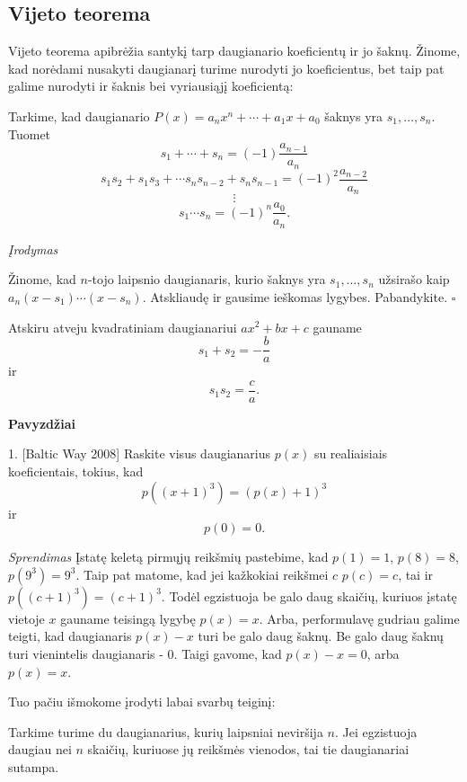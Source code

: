 \subsection{Vijeto teorema}

Vijeto teorema apibrėžia santykį tarp daugianario koeficientų ir jo šaknų.
Žinome, kad norėdami nusakyti daugianarį turime nurodyti jo koeficientus,
bet taip pat galime nurodyti ir šaknis bei vyriausiąjį koeficientą:

\begin{thm}

Tarkime, kad daugianario $P(x)=a_nx^n + \cdots + a_1x + a_0$ šaknys yra
$s_1, \dots, s_n$. Tuomet
$$s_1 + \cdots + s_n = (-1)\frac{a_{n-1}}{a_n}$$
$$s_1s_2 + s_1s_3 + \cdots s_{n}s_{n-2} + s_{n}s_{n-1} =
(-1)^2\frac{a_{n-2}}{a_n}$$
$$\vdots$$
$$s_1\cdots s_n = (-1)^{n}\frac{a_{0}}{a_n}.$$

\end{thm}

\emph{Įrodymas}

Žinome, kad $n$-tojo laipsnio daugianaris, kurio šaknys yra $s_1, \dots,
s_n$ užsirašo kaip $a_n(x-s_1)\cdots(x-s_n).$ Atskliaudę ir gausime
ieškomas lygybes. Pabandykite. $\square$

Atskiru atveju kvadratiniam daugianariui $ax^2 + bx + c$ gauname $$s_1 +
s_2 = -\frac{b}{a}$$ ir $$s_1s_2 = \frac{c}{a}.$$ 

\begin{center} \textbf{Pavyzdžiai} \end{center}
1. [Baltic Way 2008] Raskite visus daugianarius $p(x)$ su realiaisiais
koeficientais, tokius, kad $$p((x+1)^3)= (p(x)+1)^3$$ ir $$p(0)=0.$$

\emph{Sprendimas}
Įstatę keletą pirmųjų reikšmių pastebime, kad $p(1) = 1$, $p(8)=8$, $p(9^3)
= 9^3$. Taip pat matome, kad jei kažkokiai reikšmei $c$ $p(c)=c$, tai ir
$p((c+1)^3) = (c+1)^3$. Todėl egzistuoja be galo daug skaičių, kuriuos
įstatę vietoje $x$ gauname teisingą lygybę $p(x) = x$. Arba, performulavę
gudriau galime teigti, kad daugianaris $p(x)-x$ turi be galo daug šaknų. Be
galo daug šaknų turi vienintelis daugianaris - 0. Taigi gavome, kad $p(x)-x
= 0$, arba $p(x)=x$.

Tuo pačiu išmokome įrodyti labai svarbų teiginį:
\begin{teig}
Tarkime turime du daugianarius, kurių laipsniai neviršija $n$. Jei
egzistuoja daugiau nei $n$ skaičių, kuriuose jų reikšmės vienodos, tai tie
daugianariai sutampa. 
\end{teig} 

